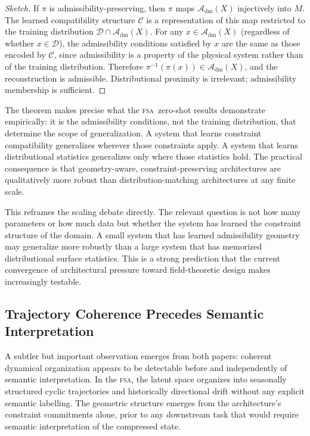 \documentclass[11pt,a4paper]{article}
\theoremstyle{plain}
\theoremstyle{definition}
\theoremstyle{remark}
\newcommand{\Adm}{\mathcal{A}_{\mathrm{dm}}}
\newcommand{\FSA}{\textup{\textsc{fsa}}}
\begin{document}
\begin{proof}[Sketch]
If $\pi$ is admissibility-preserving, then $\pi$ maps $\Adm(X)$ injectively
into $M$. The learned compatibility structure $\mathcal{C}$ is a
representation of this map restricted to the training distribution
$\mathcal{D} \cap \Adm(X)$. For any $x \in \Adm(X)$ (regardless of
whether $x \in \mathcal{D}$), the admissibility conditions satisfied by
$x$ are the same as those encoded by $\mathcal{C}$, since admissibility
is a property of the physical system rather than of the training
distribution. Therefore $\pi^{-1}(\pi(x)) \in \Adm(X)$, and the
reconstruction is admissible. Distributional proximity is irrelevant;
admissibility membership is sufficient.
\end{proof}

The theorem makes precise what the \FSA\ zero-shot results demonstrate
empirically: it is the admissibility conditions, not the training distribution,
that determine the scope of generalization. A system that learns constraint
compatibility generalizes wherever those constraints apply. A system that
learns distributional statistics generalizes only where those statistics hold.
The practical consequence is that geometry-aware, constraint-preserving
architectures are qualitatively more robust than distribution-matching
architectures at any finite scale.

This reframes the scaling debate directly. The relevant question is not how
many parameters or how much data but whether the system has learned
the constraint structure of the domain. A small system that has learned
admissibility geometry may generalize more robustly than a large system
that has memorized distributional surface statistics. This is a strong
prediction that the current convergence of architectural pressure toward
field-theoretic design makes increasingly testable.

\subsection{Trajectory Coherence Precedes Semantic Interpretation}

A subtler but important observation emerges from both papers: coherent
dynamical organization appears to be detectable before and independently
of semantic interpretation. In the \FSA, the latent space organizes into
seasonally structured cyclic trajectories and historically directional drift
without any explicit semantic labelling. The geometric structure emerges
from the architecture's constraint commitments alone, prior to any
downstream task that would require semantic interpretation of the
compressed state.
\end{document}
